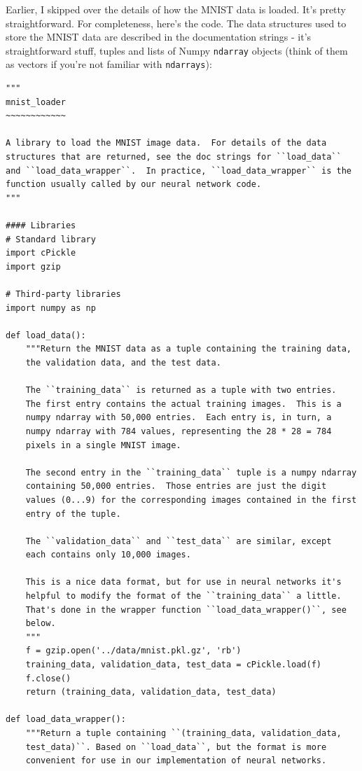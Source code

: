 Earlier, I skipped over the details of how the MNIST data is loaded. It's pretty straightforward. For completeness, here's the code. The data structures used to store the MNIST data are described in the documentation strings - it's straightforward stuff, tuples and lists of Numpy \texttt{ndarray} objects (think of them as vectors if you're not familiar with \texttt{ndarrays}):


\begin{lstlisting}
"""
mnist_loader
~~~~~~~~~~~~

A library to load the MNIST image data.  For details of the data
structures that are returned, see the doc strings for ``load_data``
and ``load_data_wrapper``.  In practice, ``load_data_wrapper`` is the
function usually called by our neural network code.
"""

#### Libraries
# Standard library
import cPickle
import gzip

# Third-party libraries
import numpy as np

def load_data():
    """Return the MNIST data as a tuple containing the training data,
    the validation data, and the test data.

    The ``training_data`` is returned as a tuple with two entries.
    The first entry contains the actual training images.  This is a
    numpy ndarray with 50,000 entries.  Each entry is, in turn, a
    numpy ndarray with 784 values, representing the 28 * 28 = 784
    pixels in a single MNIST image.

    The second entry in the ``training_data`` tuple is a numpy ndarray
    containing 50,000 entries.  Those entries are just the digit
    values (0...9) for the corresponding images contained in the first
    entry of the tuple.

    The ``validation_data`` and ``test_data`` are similar, except
    each contains only 10,000 images.

    This is a nice data format, but for use in neural networks it's
    helpful to modify the format of the ``training_data`` a little.
    That's done in the wrapper function ``load_data_wrapper()``, see
    below.
    """
    f = gzip.open('../data/mnist.pkl.gz', 'rb')
    training_data, validation_data, test_data = cPickle.load(f)
    f.close()
    return (training_data, validation_data, test_data)

def load_data_wrapper():
    """Return a tuple containing ``(training_data, validation_data,
    test_data)``. Based on ``load_data``, but the format is more
    convenient for use in our implementation of neural networks.


\end{lstlisting}
